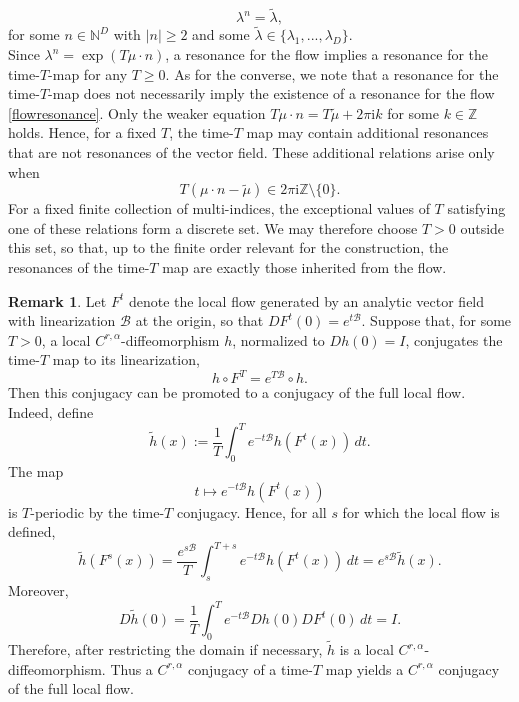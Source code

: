 \documentclass{amsart}
\newcommand{\ri}{\mathrm{i}}
\theoremstyle{plain}
\theoremstyle{definition}
\newtheorem{remark}[theorem]{Remark}
\begin{document}
\begin{equation} \label{mapresonance} 
\lambda^n = \tilde \lambda,
\end{equation}
for some $n \in \mathbb{N}^D$ with $|n|\geq2$ and some $\tilde \lambda \in \{\lambda_1,...,\lambda_D\}$.\\
Since $\lambda^n =  \exp(T \mu \cdot n)$, a resonance for the flow implies a resonance for the time-$T$-map for any $T\geq 0$.  As for the converse, we note that a resonance for the time-$T$-map does not necessarily imply the existence of a resonance for the flow \eqref{flowresonance}. Only the weaker equation $ T \mu \cdot n  =  T\tilde \mu + 2 \pi \ri k$ for some $k \in \mathbb{Z}$ holds. 
Hence, for a fixed $T$, the time-$T$ map may contain additional resonances that are not resonances of the vector field. These additional relations arise only when
\begin{equation}
T(\mu\cdot n-\widetilde\mu)\in 2\pi\ri\mathbb{Z}\setminus\{0\}.
\end{equation}
For a fixed finite collection of multi-indices, the exceptional values of $T$ satisfying one of these relations form a discrete set. We may therefore choose $T>0$ outside this set, so that, up to the finite order relevant for the construction, the resonances of the time-$T$ map are exactly those inherited from the flow. \\

\begin{remark}
Let $F^t$ denote the local flow generated by an analytic vector field with linearization $\mathcal{B}$ at the origin, so that $DF^t(0)=e^{t\mathcal{B}}$. Suppose that, for some $T>0$, a local $C^{r,\alpha}$-diffeomorphism $h$, normalized to $Dh(0)=I$, conjugates the time-$T$ map to its linearization,
\begin{equation}
h\circ F^T=e^{T\mathcal B}\circ h.
\end{equation}
Then this conjugacy can be promoted to a conjugacy of the full local flow. Indeed, define
\begin{equation}
\widetilde h(x)
:=
\frac{1}{T}\int_0^T e^{-t\mathcal{B}}h(F^t(x))\,dt.
\end{equation}
The map
\begin{equation}
t\mapsto e^{-t\mathcal B}h(F^t(x))
\end{equation}
is $T$-periodic by the time-$T$ conjugacy. Hence, for all $s$ for which the local flow is defined,
\begin{equation}
\widetilde h(F^s(x))
=
\frac{e^{s\mathcal{B}}}{T}
\int_s^{T+s} e^{-t\mathcal{B}}h(F^t(x))\,dt
=
e^{s\mathcal{B}}\widetilde h(x).
\end{equation}
Moreover,
\begin{equation}
D\widetilde h(0)
=
\frac{1}{T}\int_0^T
e^{-t\mathcal{B}}Dh(0)DF^t(0)\,dt
=
I.
\end{equation}
Therefore, after restricting the domain if necessary, $\widetilde h$ is a local $C^{r,\alpha}$-diffeomorphism. Thus a $C^{r,\alpha}$ conjugacy of a time-$T$ map yields a $C^{r,\alpha}$ conjugacy of the full local flow.
\end{remark}
\end{document}
